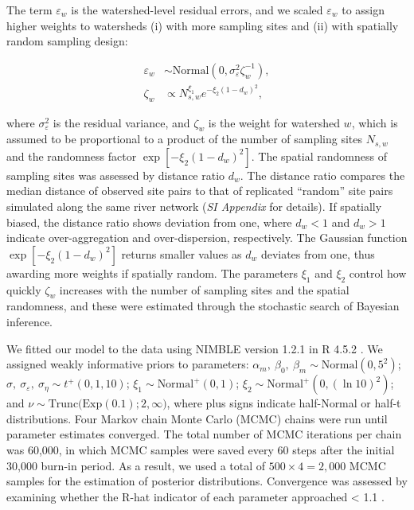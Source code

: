 \documentclass[11pt, class=article, crop=false]{standalone}
\theoremstyle{definition}
\begin{document}
The term $\varepsilon_w$ is the watershed-level residual errors, and we scaled $\varepsilon_w$ to assign higher weights to watersheds (i) with more sampling sites and (ii) with spatially random sampling design:

\begin{align}
    \varepsilon_w &\sim \mbox{Normal}(0, \sigma_{\varepsilon}^2 \zeta_w^{-1}),\\
    \zeta_w &\propto N_{s, w}^{\xi_1} e^{-\xi_2 (1 - d_{w})^2},
\end{align}

where $\sigma_{\varepsilon}^2$ is the residual variance, and $\zeta_w$ is the weight for watershed $w$, which is assumed to be proportional to a product of the number of sampling sites $N_{s,w}$ and the randomness factor $\exp[-\xi_2 (1 - d_{w})^2]$.
The spatial randomness of sampling sites was assessed by distance ratio $d_{w}$.
The distance ratio compares the median distance of observed site pairs to that of replicated ``random'' site pairs simulated along the same river network (\textit{SI Appendix} for details).
If spatially biased, the distance ratio shows deviation from one, where $d_{w} < 1$ and $d_{w} > 1$ indicate over-aggregation and over-dispersion, respectively.
The Gaussian function $\exp[-\xi_2 (1 - d_{w})^2]$ returns smaller values as $d_{w}$ deviates from one, thus awarding more weights if spatially random.
The parameters $\xi_1$ and $\xi_2$ control how quickly $\zeta_w$ increases with the number of sampling sites and the spatial randomness, and these were estimated through the stochastic search of Bayesian inference.

We fitted our model to the data using NIMBLE version 1.2.1 \citep{nimble, pkg_nimble} in R 4.5.2 \citep{r_program}.
We assigned weakly informative priors to parameters: $\alpha_m,~\beta_0,~\beta_m \sim \mbox{Normal}(0, 5^2)$; $\sigma,~\sigma_{\varepsilon},~\sigma_{\eta} \sim t^+(0, 1, 10)$; $\xi_1 \sim \mbox{Normal}^+(0, 1)$; $\xi_2 \sim \mbox{Normal}^+(0, (\ln 10)^2)$; and $\nu \sim \mbox{Trunc(Exp}(0.1); 2, \infty)$, where plus signs indicate half-Normal or half-t distributions. 
Four Markov chain Monte Carlo (MCMC) chains were run until parameter estimates
converged.
The total number of MCMC iterations per chain was 60,000, in which MCMC samples were saved every 60 steps after the initial 30,000 burn-in period.
As a result, we used a total of $500 \times 4 = 2,000$ MCMC samples for the estimation of posterior distributions.
Convergence was assessed by examining whether the R-hat indicator of each parameter approached < 1.1 \citep{gelman2013bayesian}.
\end{document}
